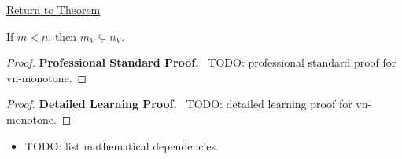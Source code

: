 \newpage
{}
\label{prf:vn-monotone}

\begin{remark*}[Return]
\hyperref[cor:vn-monotone]{Return to Theorem}
\end{remark*}

\begin{theorem*}
If $m<n$, then $m_V \subsetneq n_V$.
\end{theorem*}

\begin{proof}
\textbf{Professional Standard Proof.}~
TODO: professional standard proof for vn-monotone.
\end{proof}

\begin{proof}
\textbf{Detailed Learning Proof.}~
TODO: detailed learning proof for vn-monotone.
\end{proof}

\begin{remark*}
\end{remark*}

\begin{dependencies}
\begin{itemize}
  \item TODO: list mathematical dependencies.
\end{itemize}
\end{dependencies}

\clearpage
